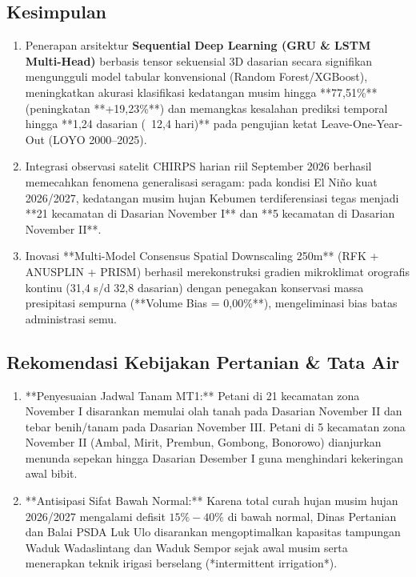 \documentclass[11pt,a4paper]{article}
\begin{document}
\subsection{Kesimpulan}
\begin{enumerate}
    \item Penerapan arsitektur \textbf{Sequential Deep Learning (GRU \& LSTM Multi-Head)} berbasis tensor sekuensial 3D dasarian secara signifikan mengungguli model tabular konvensional (Random Forest/XGBoost), meningkatkan akurasi klasifikasi kedatangan musim hingga **77,51\%** (peningkatan **+19,23\%**) dan memangkas kesalahan prediksi temporal hingga **1,24 dasarian (~12,4 hari)** pada pengujian ketat Leave-One-Year-Out (LOYO 2000--2025).
    \item Integrasi observasi satelit CHIRPS harian riil September 2026 berhasil memecahkan fenomena generalisasi seragam: pada kondisi El Ni\~no kuat 2026/2027, kedatangan musim hujan Kebumen terdiferensiasi tegas menjadi **21 kecamatan di Dasarian November I** dan **5 kecamatan di Dasarian November II**.
    \item Inovasi **Multi-Model Consensus Spatial Downscaling 250m** (RFK + ANUSPLIN + PRISM) berhasil merekonstruksi gradien mikroklimat orografis kontinu (31,4 s/d 32,8 dasarian) dengan penegakan konservasi massa presipitasi sempurna (**Volume Bias = 0,00\%**), mengeliminasi bias batas administrasi semu.
\end{enumerate}

\subsection{Rekomendasi Kebijakan Pertanian \& Tata Air}
\begin{enumerate}
    \item **Penyesuaian Jadwal Tanam MT1:** Petani di 21 kecamatan zona November I disarankan memulai olah tanah pada Dasarian November II dan tebar benih/tanam pada Dasarian November III. Petani di 5 kecamatan zona November II (Ambal, Mirit, Prembun, Gombong, Bonorowo) dianjurkan menunda sepekan hingga Dasarian Desember I guna menghindari kekeringan awal bibit.
    \item **Antisipasi Sifat Bawah Normal:** Karena total curah hujan musim hujan 2026/2027 mengalami defisit $15\% - 40\%$ di bawah normal, Dinas Pertanian dan Balai PSDA Luk Ulo disarankan mengoptimalkan kapasitas tampungan Waduk Wadaslintang dan Waduk Sempor sejak awal musim serta menerapkan teknik irigasi berselang (*intermittent irrigation*).
\end{enumerate}
\end{document}
